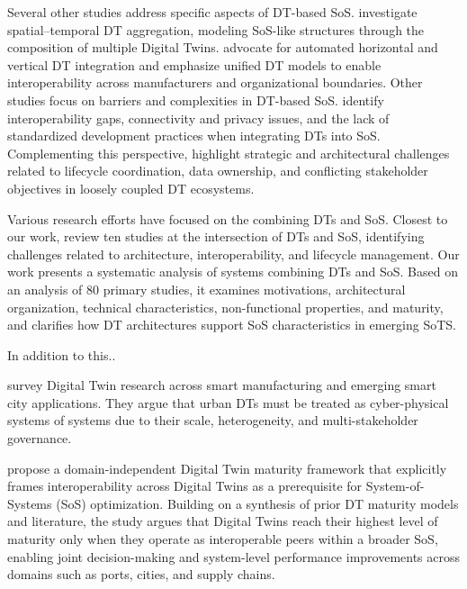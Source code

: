 Several other studies address specific aspects of DT-based SoS. \citet{dietz2020digital} investigate spatial--temporal DT aggregation, modeling SoS-like structures through the composition of multiple Digital Twins. \citet{gill2024toward} advocate for automated horizontal and vertical DT integration and emphasize unified DT models to enable interoperability across manufacturers and organizational boundaries. Other studies focus on barriers and complexities in DT-based SoS. \citet{michael2022integration} identify interoperability gaps, connectivity and privacy issues, and the lack of standardized development practices when integrating DTs into SoS. Complementing this perspective, \citet{borth2019digital} highlight strategic and architectural challenges related to lifecycle coordination, data ownership, and conflicting stakeholder objectives in loosely coupled DT ecosystems.



Various research efforts have focused on the combining DTs and SoS. 
Closest to our work, \textcite{olsson2023systems} review ten studies at the intersection of DTs and SoS, identifying challenges related to architecture, interoperability, and lifecycle management. Our work presents a systematic analysis of systems combining DTs and SoS. Based on an analysis of 80 primary studies, it examines motivations, architectural organization, technical characteristics, non-functional properties, and maturity, and clarifies how DT architectures support SoS characteristics in emerging SoTS.

In addition to this..

\textcite{mylonas2021digital} survey Digital Twin research across smart manufacturing and emerging smart city applications. They argue that urban DTs must be treated as cyber-physical systems of systems due to their scale, heterogeneity, and multi-stakeholder governance.

\textcite{klar2023digital} propose a domain-independent Digital Twin maturity framework that explicitly frames interoperability across Digital Twins as a prerequisite for System-of-Systems (SoS) optimization. Building on a synthesis of prior DT maturity models and literature, the study argues that Digital Twins reach their highest level of maturity only when they operate as interoperable peers within a broader SoS, enabling joint decision-making and system-level performance improvements across domains such as ports, cities, and supply chains.

